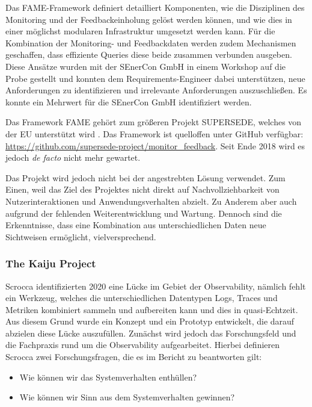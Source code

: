 Das FAME-Framework definiert detailliert Komponenten, wie die Disziplinen des Monitoring und der Feedbackeinholung gelöst werden können, und wie dies in einer möglichst modularen Infrastruktur umgesetzt werden kann. Für die Kombination der Monitoring- und Feedbackdaten werden zudem Mechanismen geschaffen, dass effiziente Queries diese beide zusammen verbunden ausgeben. Diese Ansätze wurden mit der SEnerCon GmbH in einem Workshop auf die Probe gestellt und konnten dem Requirements-Engineer dabei unterstützen, neue Anforderungen zu identifizieren und irrelevante Anforderungen auszuschließen. Es konnte ein Mehrwert für die SEnerCon GmbH identifiziert werden.

Das Framework FAME gehört zum größeren Projekt SUPERSEDE, welches von der EU unterstützt wird \cite{EUSponsorshipFAME}. Das Framework ist quelloffen unter GitHub verfügbar: \url{https://github.com/supersede-project/monitor_feedback}. Seit Ende 2018 wird es jedoch \textit{de facto} nicht mehr gewartet.

Das Projekt wird jedoch nicht bei der angestrebten Lösung verwendet. Zum Einen, weil das Ziel des Projektes nicht direkt auf Nachvollziehbarkeit von Nutzerinteraktionen und Anwendungsverhalten abzielt. Zu Anderem aber auch aufgrund der fehlenden Weiterentwicklung und Wartung. Dennoch sind die Erkenntnisse, dass eine Kombination aus unterschiedlichen Daten neue Sichtweisen ermöglicht, vielversprechend.

\subsubsection{The Kaiju Project}

Scrocca \etal \cite{TheKaijuProjectPaper} identifizierten 2020 eine Lücke im Gebiet der Observability, nämlich fehlt ein Werkzeug, welches die unterschiedlichen Datentypen Logs, Traces und Metriken kombiniert sammeln und aufbereiten kann und dies in quasi-Echtzeit. Aus diesem Grund wurde ein Konzept und ein Prototyp entwickelt, die darauf abzielen diese Lücke auszufüllen. Zunächst wird jedoch das Forschungsfeld und die Fachpraxis rund um die Observability aufgearbeitet. Hierbei definieren Scrocca \etal zwei Forschungsfragen, die es im Bericht zu beantworten gilt:

\begin{itemize}
	\item Wie können wir das Systemverhalten enthüllen?
	\item Wie können wir Sinn aus dem Systemverhalten gewinnen?
\end{itemize}

